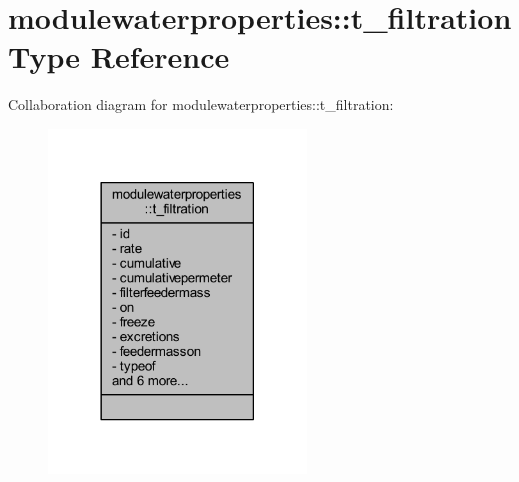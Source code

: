 \hypertarget{structmodulewaterproperties_1_1t__filtration}{}\section{modulewaterproperties\+:\+:t\+\_\+filtration Type Reference}
\label{structmodulewaterproperties_1_1t__filtration}


Collaboration diagram for modulewaterproperties\+:\+:t\+\_\+filtration\+:\nopagebreak
\begin{figure}[H]
\begin{center}
\leavevmode
\includegraphics[width=194pt]{structmodulewaterproperties_1_1t__filtration__coll__graph}
\end{center}
\end{figure}
